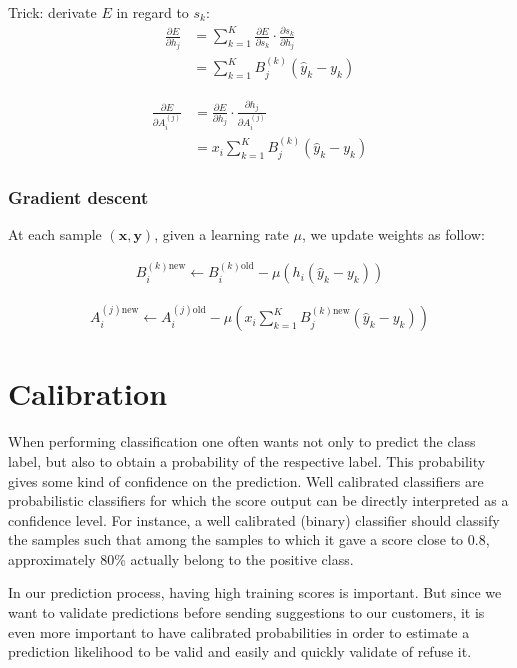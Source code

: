 Trick: derivate $E$ in regard to $s_k$:
\begin{align}
	\frac{\partial E}{\partial h_j} 
	&= 
	\sum_{k=1}^K \frac{\partial E}{\partial s_k} \cdot \frac{\partial s_k}{\partial h_j} \\
	&= 
	\sum_{k=1}^K B_j^{(k)} (\hat y_k - y_k)
\end{align}


\begin{align}
	\frac{\partial E}{\partial A_i^{(j)}} 
	&= 
	\frac{\partial E}{\partial h_j} \cdot \frac{\partial h_j}{\partial A_i^{(j)}} \\
	&= 
	x_i \sum_{k=1}^K B_j^{(k)} (\hat y_k - y_k)
\end{align}


\subsubsection*{Gradient descent}

At each sample $(\mathbf{x}, \mathbf{y})$, given a learning rate $\mu$, we update weights as follow:

\begin{align}
	B_i^{(k)\mbox{new}} \leftarrow B_i^{(k)\mbox{old}} - \mu (h_i (\hat y_k - y_k))
\end{align}

\begin{align}
	A_i^{(j)\mbox{new}} \leftarrow A_i^{(j)\mbox{old}} - 
	\mu 
	\left(
		x_i \sum_{k=1}^K B_j^{(k)\mbox{new}} (\hat y_k - y_k) 
	\right)
\end{align}



\pagebreak
\section{Calibration}

When performing classification one often wants not only to predict the class label, but also to obtain a probability of the respective label. This probability gives some kind of confidence on the prediction.
Well calibrated classifiers are probabilistic classifiers for which the score output can be directly interpreted as a confidence level. For instance, a well calibrated (binary) classifier should classify the samples such that among the samples to which it gave a score close to 0.8, approximately 80\% actually belong to the positive class.

In our prediction process, having high training scores is important. But since we want to validate predictions before sending suggestions to our customers, it is even more important to have calibrated probabilities in order to estimate a prediction likelihood to be valid and easily and quickly validate of refuse it.

